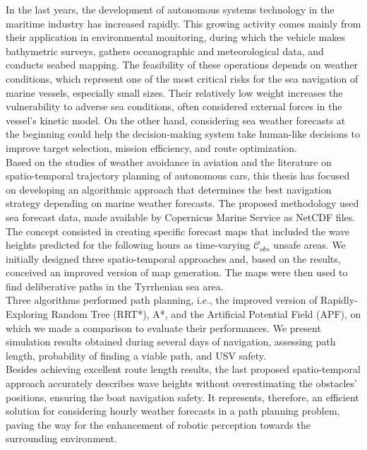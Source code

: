 In the last years, the development of autonomous systems technology in the maritime industry has increased rapidly. This growing activity comes mainly from their application in environmental monitoring, during which the vehicle makes bathymetric surveys, gathers oceanographic and meteorological data, and conducts seabed mapping.
The feasibility of these operations depends on weather conditions, which represent one of the most critical risks for the sea navigation of marine vessels, especially small sizes.
Their relatively low weight increases the vulnerability to adverse sea conditions, often considered external forces in the vessel's kinetic model. 
On the other hand, considering sea weather forecasts at the beginning could help the decision-making system take human-like decisions to improve target selection, mission efficiency, and route optimization.
\vspace{0.3cm}\\
Based on the studies of weather avoidance in aviation and the literature on spatio-temporal trajectory planning of autonomous cars, this thesis has focused on developing an algorithmic approach that determines the best navigation strategy depending on marine weather forecasts. The proposed methodology used sea forecast data, made available by Copernicus Marine Service as NetCDF files.
\vspace{0.3cm}\\
The concept consisted in creating specific forecast maps that included the wave heights predicted for the following hours as time-varying $\mathcal{C}_{obs}$ unsafe areas. We initially designed three spatio-temporal approaches and, based on the results, conceived an improved version of map generation.
The maps were then used to find deliberative paths in the Tyrrhenian sea area.
\vspace{0.3cm}\\
Three algorithms performed path planning, i.e., the improved version of Rapidly-Exploring Random Tree (RRT*), A*, and the Artificial Potential Field (APF), on which we made a comparison to evaluate their performances.
We present simulation results obtained during several days of navigation, assessing path length, probability of finding a viable path, and USV safety. 
\vspace{0.3cm}\\
Besides achieving excellent route length results, the last proposed spatio-temporal approach accurately describes wave heights without overestimating the obstacles' positions, ensuring the boat navigation safety. It represents, therefore, an efficient solution for considering hourly weather forecasts in a path planning problem, paving the way for the enhancement of robotic perception towards the surrounding environment.

